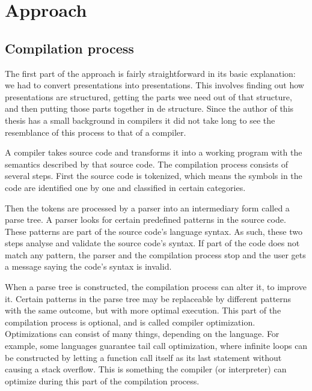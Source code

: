 
 \chapter{Approach}

  \section{Compilation process}

   The first part of the approach is fairly straightforward in its basic
   explanation: we had to convert \ppt presentations into \mxp presentations.
   This involves finding out how \ppt presentations are structured, getting the
   parts wee need out of that structure, and then putting those parts together
   in de \mxp structure. Since the author of this thesis has a small background
   in compilers \citep{vandermeersch-1} it did not take long to see the
   resemblance of this process to that of a compiler.

   A compiler takes source code and transforms it into a working program with
   the semantics described by that source code. The compilation process
   consists of several steps. First the source code is tokenized, which means
   the symbols in the code are identified one by one and classified in certain
   categories.

   Then the tokens are processed by a parser into an intermediary form called a
   parse tree. A parser looks for certain predefined patterns in the source
   code. These patterns are part of the source code's language syntax. As such,
   these two steps analyse and validate the source code's syntax. If part of
   the code does not match any pattern, the parser and the compilation process
   stop and the user gets a message saying the code's syntax is invalid.

   When a parse tree is constructed, the compilation process can alter it, to
   improve it. Certain patterns in the parse tree may be replaceable by
   different patterns with the same outcome, but with more optimal execution.
   This part of the compilation process is optional, and is called compiler
   optimization. Optimizations can consist of many things, depending on the
   language. For example, some languages guarantee tail call optimization,
   where infinite loops can be constructed by letting a function call itself as
   its last statement without causing a stack overflow. This is something the
   compiler (or interpreter) can optimize during this part of the compilation
   process.

